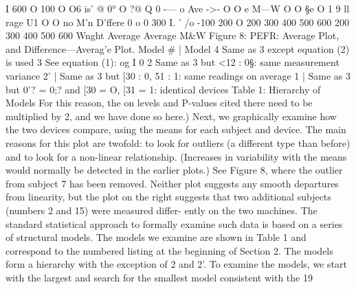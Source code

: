 I
600  O 100 O
O6
is’ @ 0° O
?@ Q
 0
-—  o
Ave
->-
O
O
e M—W
O
O 
§e
O 1
9
ll
rage
U1
O
O
no
M'n
D'ffere
0
o
0
300 I.
' /o -100
200  O
200 300 400 500 600 200 300 400 500 600
Wnght Average Average M&W
Figure 8: PEFR: Average Plot, and Difference—Averag'e Plot.
Model # | Model
4 Same as 3 except equation (2) is used
3 See equation (1): og I 0
2 Same as 3 but <12 : 0§: same measurement variance
2' | Same as 3 but [30 : 0, 51 : 1: same readings on average
1 | Same as 3 but 0'? = 0;? and [30 = O, [31 = 1: identical devices
Table 1: Hierarchy of Models
For this reason, the on levels and P-values cited there need to be multiplied by 2, and
we have done so here.)
Next, we graphically examine how the two devices compare, using the means
for each subject and device. The main reasons for this plot are twofold: to look
for outliers (a different type than before) and to look for a non-linear relationship.
(Increases in variability with the means would normally be detected in the earlier
plots.) See Figure 8, where the outlier from subject 7 has been removed.
Neither plot suggests any smooth departures from linearity, but the plot on the
right suggests that two additional subjects (numbers 2 and 15) were measured differ-
ently on the two machines.
The standard statistical approach to formally examine such data is based on
a series of structural models. The models we examine are shown in Table 1 and
correspond to the numbered listing at the beginning of Section 2.
The models form a hierarchy with the exception of 2 and 2’. To examine the
models, we start with the largest and search for the smallest model consistent with the
19



